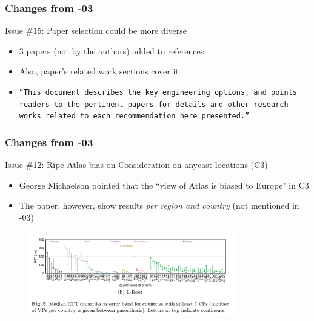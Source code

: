\documentclass[11pt,show 
notes,notheorems,noamsthm,blank]{beamer} %
\begin{document}
\begin{frame}
\frametitle{Changes from -03}
\begin{block}{ Issue \#15: Paper selection could be more diverse}
\begin{itemize}
\item 3 papers (not by the authors) added to references
\item Also, paper's related work sections cover it
\item \texttt{``This document describes the key engineering options, and points readers to the pertinent papers for details and other research works related to each recommendation here presented.''}
%  
%  
% 
% 
\end{itemize} 

 
\end{block}
\end{frame}



\begin{frame}
\frametitle{Changes from -03}
\begin{block}{ Issue \#12: Ripe Atlas bias on Consideration on anycast locations (C3)}
\begin{itemize}
\item George Michaelson pointed that the ``view of Atlas is biased to Europe" in C3
\item The paper, however, show results \textit{per region and country} (not mentioned in -03)



\end{itemize} 

\end{block}
\vspace{-0.5cm}

\begin{figure}
\centering
   \includegraphics[width= 9cm]{rtt-schmidt17a.png}
\end{figure}

\end{frame}
\end{document}
